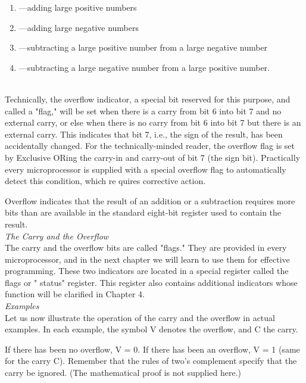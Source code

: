 \documentclass[12pt]{book}
\begin{document}
\begin{enumerate}
	\item{—adding large positive numbers}
	\item{—adding large negative numbers}
	\item{—subtracting a large positive number from a large negative number}
	\item{—subtracting a large negative number from a large positive number.}
\end{enumerate}
\\

Technically, the overflow indicator, a special bit reserved for this purpose, and called a "flag," will be set when there is a carry from bit 6 into bit 7 and no external carry, or else when there is no carry from bit 6 into bit 7 but there is an external carry. This indicates that bit 7, i.e., the sign of the result, has been accidentally changed. For the technically-minded reader, the overflow flag is set by Exclusive ORing the carry-in and carry-out of bit 7 (the sign bit). Practically every microprocessor is supplied with a special overflow flag to automatically detect this condition, which re quires corrective action.

Overflow indicates that the result of an addition or a subtraction requires more bits than are available in the standard eight-bit register used to contain the result.\\

\noindent\textit{The Carry and the Overflow}\\

The carry and the overflow bits are called "flags." They are provided in every microprocessor, and in the next chapter we will learn to use them for effective programming. These two indicators are located in a special register called the flags or " status" register. This register also contains additional indicators whose function will be clarified in Chapter 4.\\

\noindent\textit{Examples}\\

Let us now illustrate the operation of the carry and the overflow in actual examples. In each example, the symbol V denotes the overflow, and C the carry.

If there has been no overflow, V = 0. If there has been an overflow, V = 1 (same for the carry C). Remember that the rules of two's complement specify that the carry be ignored. (The mathematical proof is not supplied here.)\\
\end{document}
